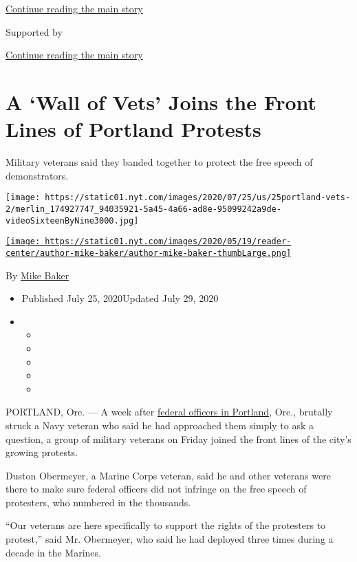 \protect\hyperlink{after-top}{Continue reading the main story}

Supported by

\protect\hyperlink{after-sponsor}{Continue reading the main story}

\hypertarget{a-wall-of-vets-joins-the-front-lines-of-portland-protests}{%
\section{A `Wall of Vets' Joins the Front Lines of Portland
Protests}\label{a-wall-of-vets-joins-the-front-lines-of-portland-protests}}

Military veterans said they banded together to protect the free speech
of demonstrators.

\texttt{[image: https://static01.nyt.com/images/2020/07/25/us/25portland-vets-2/merlin\_174927747\_94035921-5a45-4a66-ad8e-95099242a9de-videoSixteenByNine3000.jpg]}

\href{https://www.nytimes.com/by/mike-baker}{\texttt{[image: https://static01.nyt.com/images/2020/05/19/reader-center/author-mike-baker/author-mike-baker-thumbLarge.png]}}

By \href{https://www.nytimes.com/by/mike-baker}{Mike Baker}

\begin{itemize}
\item
  Published July 25, 2020Updated July 29, 2020
\item
  \begin{itemize}
  \item
  \item
  \item
  \item
  \item
  \end{itemize}
\end{itemize}

PORTLAND, Ore. --- A week after
\href{https://www.nytimes.com/2020/07/29/us/protests-portland-federal-withdrawal.html}{federal
officers in Portland}, Ore., brutally struck a Navy veteran who said he
had approached them simply to ask a question, a group of military
veterans on Friday joined the front lines of the city's growing
protests.

Duston Obermeyer, a Marine Corps veteran, said he and other veterans
were there to make sure federal officers did not infringe on the free
speech of protesters, who numbered in the thousands.

``Our veterans are here specifically to support the rights of the
protesters to protest,'' said Mr. Obermeyer, who said he had deployed
three times during a decade in the Marines.

